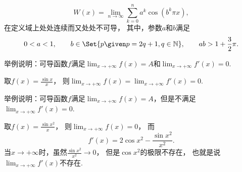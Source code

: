 \begin{example}
\[
	W(x) = \lim_{n\to\infty} \sum_{k=0}^n a^k \cos(b^k \pi x),
\]在定义域上处处连续而又处处不可导，
其中，参数\(a\)和\(b\)满足\[
	0<a<1,
	\qquad
	b\in\Set{ p \given p = 2q+1, q\in\mathbb{N} },
	\qquad
	ab > 1+\frac{3}{2}\pi.
\]
\end{example}

\begin{example}
举例说明：可导函数\(f\)满足\(\lim_{x\to+\infty} f(x) = A\)和\(\lim_{x\to+\infty} f'(x) = 0\).
\begin{solution}
取\(f(x) = \frac{\sin x}{x}\)，
则\(\lim_{x\to+\infty} f(x) = \lim_{x\to+\infty} f'(x) = 0\).
\end{solution}
\end{example}
\begin{example}
举例说明：可导函数\(f\)满足\(\lim_{x\to+\infty} f(x) = A\)，但是不满足\(\lim_{x\to+\infty} f'(x) = 0\).
\begin{solution}
取\(f(x) = \frac{\sin x^2}{x}\)，
则\(\lim_{x\to+\infty} f(x) = 0\)，
而\[
	f'(x) = 2 \cos x^2 - \frac{\sin x^2}{x^2}.
\]
当\(x\to+\infty\)时，虽然\(\frac{\sin x^2}{x^2} \to 0\)，
但是\(\cos x^2\)的极限不存在，
也就是说\(\lim_{x\to+\infty} f'(x)\)不存在.
\end{solution}
\end{example}

